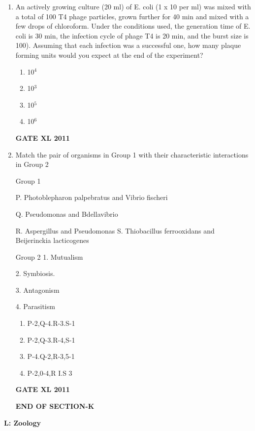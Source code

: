 \documentclass[journal,12pt,onecolumn]{IEEEtran}
\begin{document}
\begin{enumerate}
\item {An actively growing culture (20 ml) of E. coli (1 x 10 per ml) was mixed with a total of 100 T4 phage particles, grown further for 40 min and mixed with a few drops of chloroform. Under the conditions used, the generation time of E. coli is 30 min, the infection cycle of phage T4 is 20 min, and the burst size is 100). Assuming that each infection was a successful one, how many plaque forming units would you expect at the end of the experiment?}
		\begin{enumerate}
			\item 10$^4$
			\item 10$^3$
			\item 10$^5$
			\item 10$^6$
		\end{enumerate}
		\hfill{\textbf{GATE XL 2011}}
\item {Match the pair of organisms in Group 1 with their characteristic interactions in Group 2}
\newline
\begin{minipage}{0.5\textwidth}
	\begin{flushleft}

Group 1

P. Photoblepharon palpebratus and Vibrio fischeri

Q. Pseudomonas and Bdellavibrio

R. Aspergillus and Pseudomonas
S. Thiobacillus ferrooxidans and Beijerinckia lacticogenes

		\end{flushleft}
		\end{minipage}
	\begin{minipage}{0.5\textwidth}
		\begin{flushleft}

Group 2
1. Mutualism

2. Symbiosis.


3. Antagonism


4. Parasitism
		\end{flushleft}
		\end{minipage}


		\begin{enumerate}
			\item P-2,Q-4.R-3.S-1
			\item P-2,Q-3.R-4,S-1
			\item P-4.Q-2,R-3,5-1
			\item P-2,0-4,R I.S 3
		\end{enumerate}
		\hfill{\textbf{GATE XL 2011}}

\textbf{END OF SECTION-K}

\end{enumerate}
\newpage
		\textbf{L: Zoology}
\end{document}
